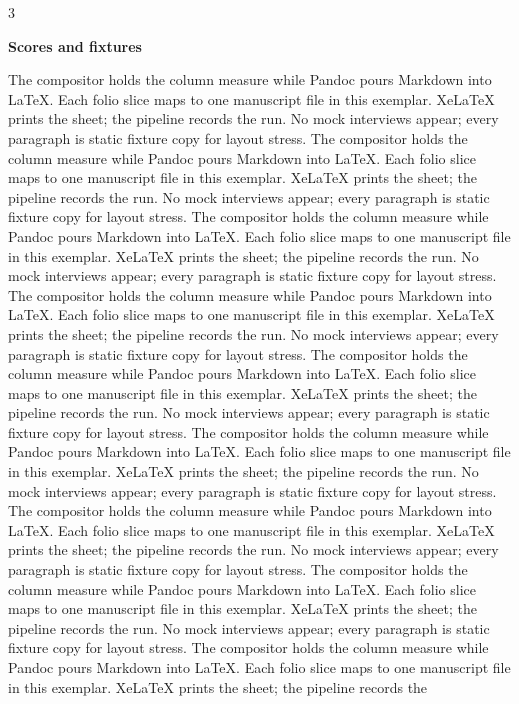 \documentclass[
]{article}
\begin{document}
\begin{multicols}{3}

\textbf{Scores and fixtures}

The compositor holds the column measure while Pandoc pours Markdown into
LaTeX. Each folio slice maps to one manuscript file in this exemplar.
XeLaTeX prints the sheet; the pipeline records the run. No mock
interviews appear; every paragraph is static fixture copy for layout
stress. The compositor holds the column measure while Pandoc pours
Markdown into LaTeX. Each folio slice maps to one manuscript file in
this exemplar. XeLaTeX prints the sheet; the pipeline records the run.
No mock interviews appear; every paragraph is static fixture copy for
layout stress. The compositor holds the column measure while Pandoc
pours Markdown into LaTeX. Each folio slice maps to one manuscript file
in this exemplar. XeLaTeX prints the sheet; the pipeline records the
run. No mock interviews appear; every paragraph is static fixture copy
for layout stress. The compositor holds the column measure while Pandoc
pours Markdown into LaTeX. Each folio slice maps to one manuscript file
in this exemplar. XeLaTeX prints the sheet; the pipeline records the
run. No mock interviews appear; every paragraph is static fixture copy
for layout stress. The compositor holds the column measure while Pandoc
pours Markdown into LaTeX. Each folio slice maps to one manuscript file
in this exemplar. XeLaTeX prints the sheet; the pipeline records the
run. No mock interviews appear; every paragraph is static fixture copy
for layout stress. The compositor holds the column measure while Pandoc
pours Markdown into LaTeX. Each folio slice maps to one manuscript file
in this exemplar. XeLaTeX prints the sheet; the pipeline records the
run. No mock interviews appear; every paragraph is static fixture copy
for layout stress. The compositor holds the column measure while Pandoc
pours Markdown into LaTeX. Each folio slice maps to one manuscript file
in this exemplar. XeLaTeX prints the sheet; the pipeline records the
run. No mock interviews appear; every paragraph is static fixture copy
for layout stress. The compositor holds the column measure while Pandoc
pours Markdown into LaTeX. Each folio slice maps to one manuscript file
in this exemplar. XeLaTeX prints the sheet; the pipeline records the
run. No mock interviews appear; every paragraph is static fixture copy
for layout stress. The compositor holds the column measure while Pandoc
pours Markdown into LaTeX. Each folio slice maps to one manuscript file
in this exemplar. XeLaTeX prints the sheet; the pipeline records the

\end{multicols}
\end{document}
